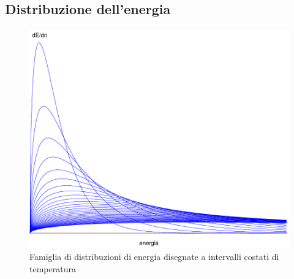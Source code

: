 \subsection{Distribuzione dell'energia}
\begin{figure}[htbp]
\centering
\includegraphics[scale=0.7]{immagini/fisica1/energia_max}
\caption{Famiglia di distribuzioni di energia disegnate a intervalli costati di temperatura}
\end{figure}

